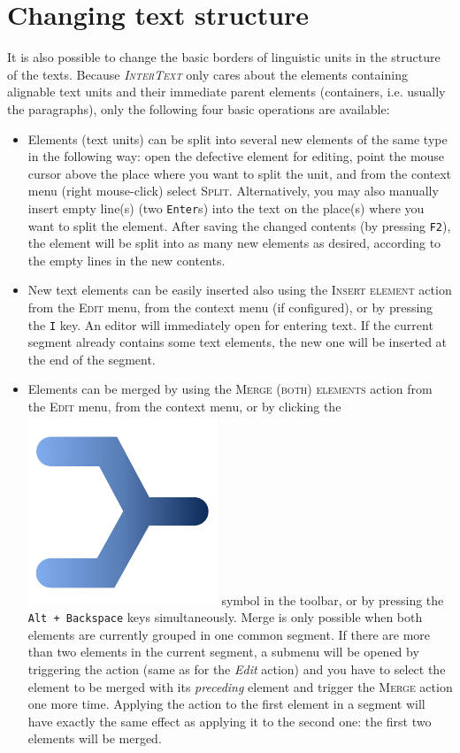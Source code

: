 \documentclass[a4paper,10pt,oneside]{book}
\newcommand{\IT}{\textit{\textsc{InterText}}\xspace}
\newcommand{\keys}[1]{\texttt{#1}}
\newcommand{\menu}[1]{\textsc{#1}}
\begin{document}
\section{Changing text structure}\label{ch:howto:edit_struc}

It is also possible to change the basic borders of linguistic units in the structure of the texts. Because \IT only cares about the elements containing alignable text units and their immediate parent elements (containers, i.e. usually the paragraphs), only the following four basic operations are available:

\begin{itemize}
 \item Elements (text units) can be split into several new elements of the same type in the following way: open the defective element for editing, point the mouse cursor above the place where you want to split the unit, and from the context menu (right mouse-click) select \menu{Split}. Alternatively, you may also manually insert empty line(s) (two \keys{Enter}s) into the text on the place(s) where you want to split the element. After saving the changed contents (by pressing \keys{F2}), the element will be split into as many new elements as desired, according to the empty lines in the new contents.
 \item New text elements can be easily inserted also using the \menu{Insert element} action from the \menu{Edit} menu, from the context menu (if configured), or by pressing the \keys{I} key. An editor will immediately open for entering text. If the current segment already contains some text elements, the new one will be inserted at the end of the segment.
 \item Elements can be merged by using the \menu{Merge (both) elements} action from the \menu{Edit} menu, from the context menu, or by clicking the \includegraphics[height=2ex]{merge.pdf} symbol in the toolbar, or by pressing the \keys{Alt + Backspace} keys simultaneously. Merge is only possible when both elements are currently grouped in one common segment. If there are more than two elements in the current segment, a submenu will be opened by triggering the action (same as for the \emph{Edit} action) and you have to select the element to be merged with its \emph{preceding} element and trigger the \menu{Merge} action one more time. Applying the action to the first element in a segment will have exactly the same effect as applying it to the second one: the first two elements will be merged.

\end{itemize}
\end{document}
